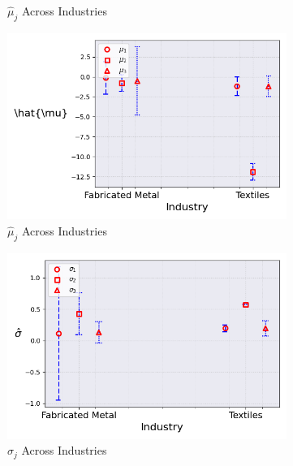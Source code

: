\documentclass{article}
\begin{document}
\begin{figure}[ht!]
\begin{subfigure}[t]{0.32\textwidth}
        \caption{$\hat\mu_j$ Across Industries}
    \end{subfigure}
    \begin{subfigure}[t]{0.32\textwidth}
        \centering
        \includegraphics[width=\textwidth]{figure/ar1_mixture_kmshare_ciiu_mubar_across_industries_m3.png}
        \caption{$\hat{\mu}_j$ Across Industries}
    \end{subfigure}
    \begin{subfigure}[t]{0.32\textwidth}
        \centering
        \includegraphics[width=\textwidth]{figure/ar1_mixture_kmshare_ciiu_sigma_across_industries_m3.png}
        \caption{$\hat\sigma_j$ Across Industries}
    \end{subfigure}
    \begin{subfigure}[t]{0.32\textwidth}
        \centering

\end{subfigure}
\end{figure}
\end{document}
